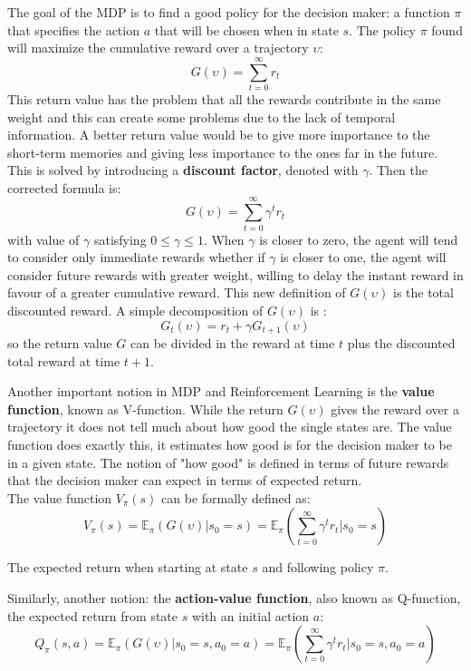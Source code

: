 \documentclass[14pt]{extarticle}
\def\pp{\vspace{10pt}\newline}
\def\ppn{\vspace{10pt}}
\begin{document}
\begin{flushleft}
\ppn
The goal of the MDP is to find a good policy for the decision maker: a function $\pi$ that specifies the action $a$ that will be chosen when in state $s$. The policy $\pi$ found will maximize the cumulative reward over a trajectory $\upsilon$:
\[ G(\upsilon) = \sum_{t=0}^{\infty} r_t \] 
This return value has the problem that all the rewards contribute in the same weight and this can create some problems due to the lack of temporal information. A better return value would be to give more importance to the short-term memories and giving less importance to the ones far in the future. This is solved by introducing a \textbf{discount factor}, denoted with $\gamma$. Then the corrected formula is: 
\[ G(\upsilon) = \sum_{t=0}^{\infty} \gamma^t r_t \]
with value of $\gamma$ satisfying $ 0 \leq \gamma \leq 1$. When $\gamma$ is closer to zero, the agent will tend to consider only immediate rewards whether if $\gamma$ is closer to one, the agent will consider future rewards with greater weight, willing to delay the instant reward in favour of a greater cumulative reward. 
This new definition of $G(\upsilon)$ is the total discounted reward.
\pp
A simple decomposition of $G(\upsilon)$ is : 
\[ G_t(\upsilon) = r_t + \gamma G_{t+1}(\upsilon)\]
so the return value $G$ can be divided in the reward at time $t$ plus the discounted total reward at time $t+1$.

\ppn
Another important notion in MDP and Reinforcement Learning is the \textbf{value function}, known as V-function. While the return $G(\upsilon)$ gives the reward over a trajectory it does not tell much about how good the single states are. The value function does exactly this, it estimates how good is for the decision maker to be in a given state. The notion of "how good" is defined in terms of future rewards that the decision maker can expect in terms of expected return.
\\
The value function $V_{\pi}(s)$ can be formally defined as: 
\[V_{\pi}(s) = \mathbb{E}_{\pi}(G(\upsilon)|s_0=s) = \mathbb{E}_{\pi}(\sum_{t=0}^{\infty} \gamma^t r_t|s_0=s)\]
\vspace{-9.3mm}
\begin{center}
The expected return when starting at state $s$ and following policy $\pi$.
\end{center}

Similarly, another notion: the \textbf{action-value function}, also known as Q-function, the expected return from state $s$ with an initial action $a$:
\[Q_{\pi}(s,a) = \mathbb{E}_{\pi}(G(\upsilon)|s_0=s, a_0=a) = \mathbb{E}_{\pi}(\sum_{t=0}^{\infty} \gamma^t r_t|s_0=s,a_0=a)\]


\end{flushleft}
\end{document}
